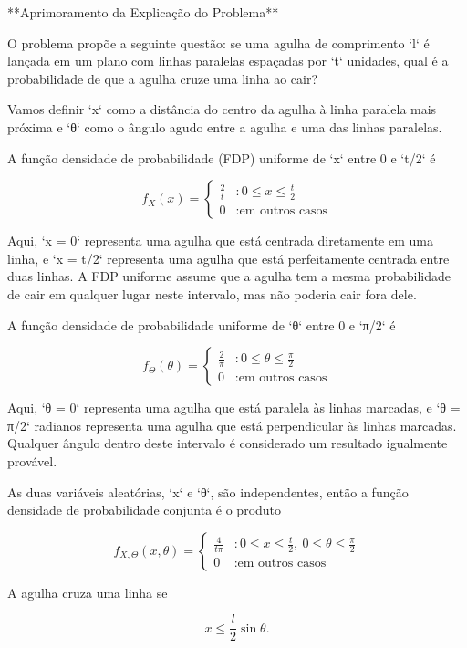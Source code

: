 **Aprimoramento da Explicação do Problema**

O problema propõe a seguinte questão: se uma agulha de comprimento `l` é lançada em um plano com linhas paralelas espaçadas por `t` unidades, qual é a probabilidade de que a agulha cruze uma linha ao cair?

Vamos definir `x` como a distância do centro da agulha à linha paralela mais próxima e `θ` como o ângulo agudo entre a agulha e uma das linhas paralelas.

A função densidade de probabilidade (FDP) uniforme de `x` entre 0 e `t/2` é

$$
f_{X}(x) = 
\begin{cases} 
\frac{2}{t} & : 0 \leq x \leq \frac{t}{2} \\
0 & : \text{em outros casos}
\end{cases}
$$

Aqui, `x = 0` representa uma agulha que está centrada diretamente em uma linha, e `x = t/2` representa uma agulha que está perfeitamente centrada entre duas linhas. A FDP uniforme assume que a agulha tem a mesma probabilidade de cair em qualquer lugar neste intervalo, mas não poderia cair fora dele.

A função densidade de probabilidade uniforme de `θ` entre 0 e `π/2` é

$$
f_{\Theta}(\theta) = 
\begin{cases} 
\frac{2}{\pi} & : 0 \leq \theta \leq \frac{\pi}{2} \\
0 & : \text{em outros casos}
\end{cases}
$$

Aqui, `θ = 0` representa uma agulha que está paralela às linhas marcadas, e `θ = π/2` radianos representa uma agulha que está perpendicular às linhas marcadas. Qualquer ângulo dentro deste intervalo é considerado um resultado igualmente provável.

As duas variáveis aleatórias, `x` e `θ`, são independentes, então a função densidade de probabilidade conjunta é o produto

$$
f_{X,\Theta}(x,\theta) = 
\begin{cases} 
\frac{4}{t\pi} & : 0 \leq x \leq \frac{t}{2},\ 0 \leq \theta \leq \frac{\pi}{2} \\
0 & : \text{em outros casos}
\end{cases}
$$

A agulha cruza uma linha se

$$
x \leq \frac{l}{2} \sin \theta.
$$

